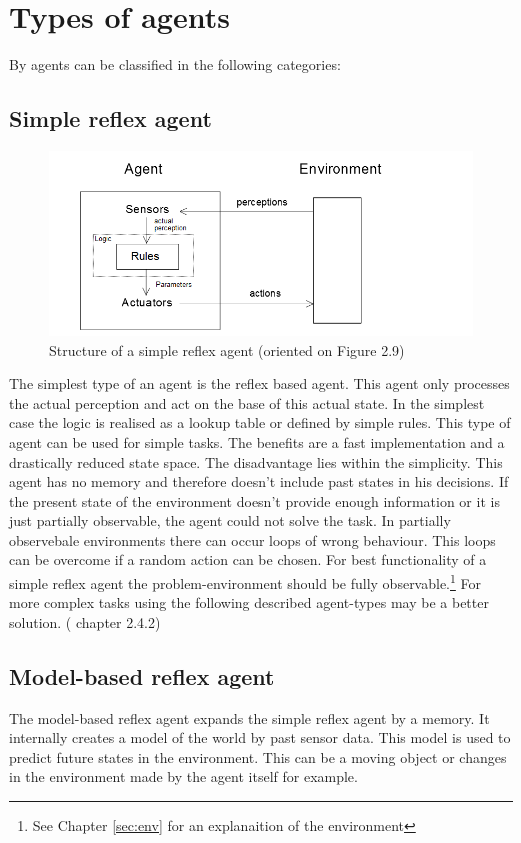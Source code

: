 \documentclass[10pt,a4paper,DIV=11]{scrreprt}
\begin{document}
\section{Types of agents}
By \cite{ai} agents can be classified in the following categories:
\subsection{Simple reflex agent}


\begin{center}
	\begin{figure}[H]
		\centering
		\includegraphics[width=1.0\textwidth,scale=1]{files/Reflexagent.png}  
		\caption{Structure of a simple reflex agent (oriented on \cite{ai} Figure 2.9)} 
		\label{fig:agentr}
	\end{figure}
\end{center}

The simplest type of an agent is the reflex based agent.
This agent only processes the actual perception and act on the base of this actual state. In the simplest case the logic is realised as a lookup table or defined by simple rules. This type of agent can be used for simple tasks. The benefits are a fast implementation and a drastically reduced state space.
The disadvantage lies within the simplicity. This agent has no memory and therefore doesn't include past states in his decisions. If the present state of the environment doesn't provide enough information or it is just partially observable, the agent could not solve the task.
In partially observebale environments there can occur loops of wrong behaviour. This loops can be overcome if a random action can be chosen.
For best functionality of a simple reflex agent the problem-environment should be fully observable.\footnote{See Chapter \ref{sec:env} for an explanaition of the environment}
For more complex tasks using the following described agent-types may be a better solution.
(\cite{ai} chapter 2.4.2)
\subsection{Model-based reflex agent}
The model-based reflex agent expands the simple reflex agent by a memory. It internally creates a model of the world by past sensor data. This model is used to predict future states in the environment.
This can be a moving object or changes in the environment made by the agent itself for example.
\end{document}
